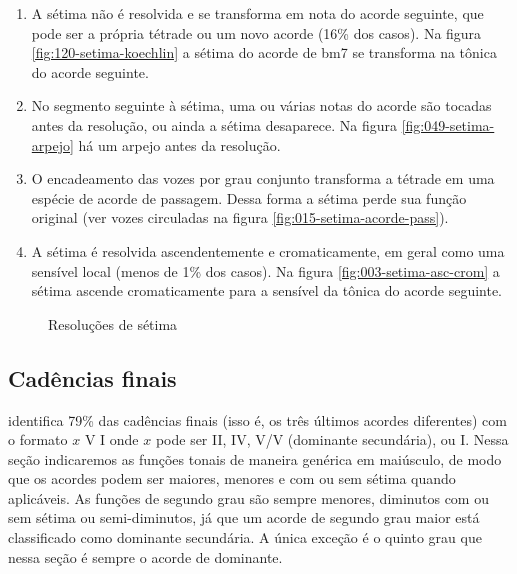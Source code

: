 \begin{enumerate}
\item A sétima não é resolvida e se transforma em nota do acorde
  seguinte, que pode ser a própria tétrade ou um novo acorde (16\% dos
  casos). Na figura \ref{fig:120-setima-koechlin} a sétima do acorde
  de bm7 se transforma na tônica do acorde seguinte.
\item No segmento seguinte à sétima, uma ou várias notas do acorde são
  tocadas antes da resolução, ou ainda a sétima desaparece. Na figura
  \ref{fig:049-setima-arpejo} há um arpejo antes da resolução.
\item O encadeamento das vozes por grau conjunto transforma a tétrade
  em uma espécie de acorde de passagem. Dessa forma a sétima perde sua
  função original (ver vozes circuladas na figura
  \ref{fig:015-setima-acorde-pass}).
\item A sétima é resolvida ascendentemente e cromaticamente, em geral
  como uma sensível local (menos de 1\% dos casos). Na figura
  \ref{fig:003-setima-asc-crom} a sétima ascende cromaticamente para a
  sensível da tônica do acorde seguinte.
\end{enumerate}

\begin{figure}[!h]
  \centering
  \caption{Resoluções de sétima}
  \label{fig:setima-resol}
\end{figure}

\subsection{Cadências finais}
\label{sec:cadencias}

\rameau{} identifica 79\% das cadências finais (isso é, os três
últimos acordes diferentes) com o formato $x$ V I onde $x$ pode ser
II, IV, V/V (dominante secundária), ou I. Nessa seção indicaremos as
funções tonais de maneira genérica em maiúsculo, de modo que os
acordes podem ser maiores, menores e com ou sem sétima quando
aplicáveis. As funções de segundo grau são sempre menores, diminutos
com ou sem sétima ou semi-diminutos, já que um acorde de segundo grau
maior está classificado como dominante secundária. A única exceção é o
quinto grau que nessa seção é sempre o acorde de dominante.


